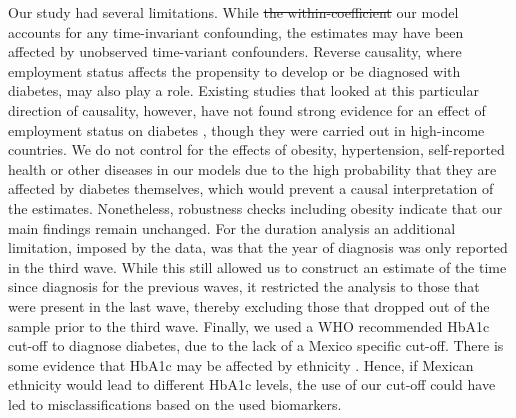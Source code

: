 \documentclass[12pt,english]{article}
\providecommand{\DIFaddtex}[1]{{\protect\color{blue}#1}} %
\providecommand{\DIFdeltex}[1]{{\protect\color{red}\sout{#1}}}                      %
\providecommand{\DIFaddbegin}{} %
\providecommand{\DIFaddend}{} %
\providecommand{\DIFdelbegin}{} %
\providecommand{\DIFdelend}{} %
\providecommand{\DIFadd}[1]{\texorpdfstring{\DIFaddtex{#1}}{#1}} %
\providecommand{\DIFdel}[1]{\texorpdfstring{\DIFdeltex{#1}}{}} %
\begin{document}
Our study had several limitations. While \DIFdelbegin \DIFdel{the within-coefficient }\DIFdelend \DIFaddbegin \DIFadd{our model }\DIFaddend accounts for any time-invariant confounding, the estimates may have been affected by unobserved time-variant confounders. Reverse causality, where employment status affects the propensity to develop or be diagnosed with diabetes, may also play a role. Existing studies that looked at this particular direction of causality, however, have not found strong evidence for an effect of employment status on diabetes \parencite{Bergemann2011,Schaller2015}, though they were carried out in high-income countries. \DIFaddbegin \DIFadd{We do not control for the effects of obesity, hypertension, self-reported health or other diseases in our models due to the high probability that they are affected by diabetes themselves, which would prevent a causal interpretation of the estimates. Nonetheless, robustness checks including obesity indicate that our main findings remain unchanged.  }\DIFaddend For the duration analysis an additional limitation, imposed by the data, was that the year of diagnosis was only reported in the third wave. While this still allowed us to construct an estimate of the time since diagnosis for the previous waves, it restricted the analysis to those that were present in the last wave, thereby excluding those that dropped out of the sample prior to the third wave. \DIFaddbegin \DIFadd{Finally, we used a WHO recommended }\ac{HbA1c} \DIFadd{cut-off to diagnose diabetes, due to the lack of a Mexico specific cut-off. There is some evidence that }\ac{HbA1c} \DIFadd{may be affected by ethnicity }\parencite{Sacks2011}\DIFadd{. Hence, if Mexican ethnicity would lead to different }\ac{HbA1c} \DIFadd{levels, the use of our cut-off could have led to misclassifications based on the used biomarkers.  
}\DIFaddend 
\end{document}
